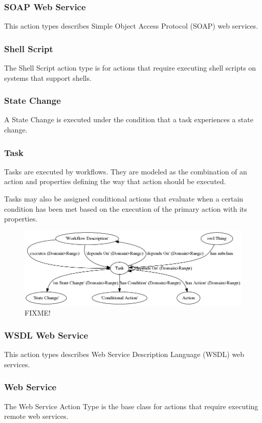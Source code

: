 			\subsubsection{
			SOAP Web Service
			}
			This action types describes Simple Object Access Protocol (SOAP) web services.
			\subsubsection{
			Shell Script
			}
			The Shell Script action type is for actions that require executing shell scripts on systems that support shells.
			\subsubsection{
			State Change
			}
			A State Change is executed under the condition that a task experiences a state change.
\subsubsection{Task}

Tasks are executed by workflows. They are modeled as the combination of an
action and properties defining the way that action should be executed.

Tasks may also be assigned conditional actions that evaluate when a certain
condition has been met based on the execution of the primary action with its properties.

\begin{figure}[htbp]
\centering
\includegraphics[width=\textwidth]{figures/task.png}
\caption{FIXME!}
\label{task}
\end{figure}


			\subsubsection{
			WSDL Web Service
			}
			This action types describes Web Service Description Language (WSDL) web services.
			\subsubsection{
			Web Service
			}
			The Web Service Action Type is the base class for actions that require executing remote web services.
